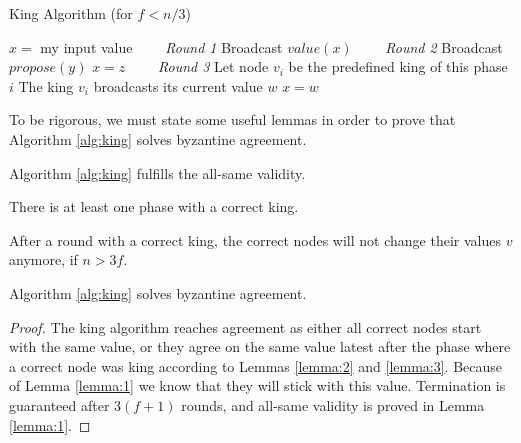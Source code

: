 \begin{algorithm}
	\caption{King Algorithm (for $f<n/3$)}
	\label{alg:king}
	\begin{algorithmic}[1]
		\State $x =$ my input value
		\Statex \ \ \ \ \textit{Round 1}
		\State Broadcast $value(x)$
		\Statex \ \ \ \ \textit{Round 2}
		\State Broadcast $propose(y)$
		\EndIf 
		\State $x=z$
		\EndIf
		\Statex \ \ \ \ \textit{Round 3}
		\State Let node $v_{i}$ be the predefined king of this phase $i$
		\State The king $v_{i}$ broadcasts its current value $w$
		\State $x=w$
		\EndIf
		\EndFor
	\end{algorithmic}
\end{algorithm}

\newpage

\bigskip
\noindent
To be rigorous, we must state some useful lemmas in order to prove that Algorithm \ref{alg:king} solves byzantine agreement.
\begin{mylemma}
    \label{lemma:1}
    Algorithm \ref{alg:king} fulfills the all-same validity.
\end{mylemma}
\begin{mylemma}
    \label{lemma:2}
    There is at least one phase with a correct king.
\end{mylemma}
\begin{mylemma}
    \label{lemma:3}
    After a round with a correct king, the correct nodes will not change their values $v$ anymore, if $n > 3f$.
\end{mylemma}

\begin{thm}
    Algorithm \ref{alg:king} solves byzantine agreement.
\end{thm}
\begin{proof}
    The king algorithm reaches agreement as either all correct nodes start with the same value, or they agree on the same value latest after the phase where a correct node was king according to Lemmas \ref{lemma:2} and \ref{lemma:3}. Because of Lemma \ref{lemma:1} we know that they will stick with this value. Termination is guaranteed after $3(f+1)$ rounds, and all-same validity is proved in Lemma \ref{lemma:1}.
\end{proof}

